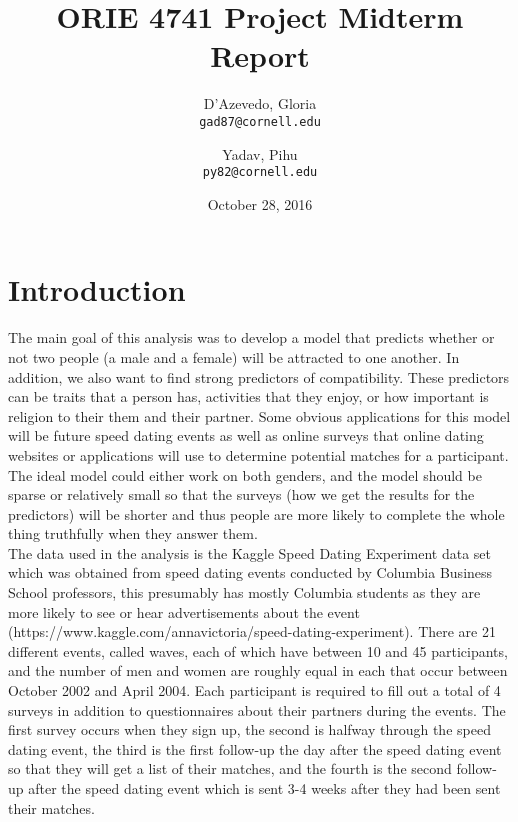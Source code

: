 \documentclass{article}
\title{ORIE 4741 Project Midterm Report}
\author{
  D'Azevedo, Gloria\\
  \texttt{gad87@cornell.edu}
  \and
  Yadav, Pihu\\
  \texttt{py82@cornell.edu}
}
\date{October 28, 2016}
\begin{document}
\maketitle



\section{Introduction}
The main goal of this analysis was to develop a model that predicts whether or not two people (a male and a female) will be attracted to one another.  In addition, we also want to find strong predictors of compatibility.  These predictors can be traits that a person has, activities that they enjoy, or how important is religion to their them and their partner.  Some obvious applications for this model will be future speed dating events as well as online surveys that online dating websites or applications will use to determine potential matches for a participant. The ideal model could either work on both genders, and the model should be sparse or relatively small so that the surveys (how we get the results for the predictors) will be shorter and thus people are more likely to complete the whole thing truthfully when they answer them.\\

The data used in the analysis is the Kaggle Speed Dating Experiment data set which was obtained from speed dating events conducted by Columbia Business School professors, this presumably has mostly Columbia students as they are more likely to see or hear advertisements about the event (https://www.kaggle.com/annavictoria/speed-dating-experiment). There are 21 different events, called waves, each of which have between 10 and 45 participants, and the number of men and women are roughly equal in each that occur between October 2002 and April 2004.  Each participant is required to fill out a total of 4 surveys in addition to questionnaires about their partners during the events.  The first survey occurs when they sign up, the second is halfway through the speed dating event, the third is the first follow-up the day after the speed dating event so that they will get a list of their matches, and the fourth is the second follow-up after the speed dating event which is sent 3-4 weeks after they had been sent their matches. \\
\end{document}
